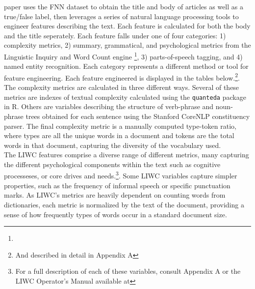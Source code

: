 \documentclass[12pt]{article}
\begin{document}
paper uses the FNN dataset to obtain the title and body of articles as
well as a true/false label, then leverages a series of natural language
processing tools to engineer features describing the text. Each feature
is calculated for both the body and the title seperately. Each feature
falls under one of four categories: 1) complexity metrics, 2) summary,
grammatical, and psychological metrics from the Linguistic Inquiry and
Word Count engine \footnote{}, 3) parts-of-speech tagging, and 4) named
entity recognition. Each category represents a different method or tool
for feature engineering. Each feature engineered is displayed in the
tables below.\footnote{And described in detail in Appendix A}.\\
\hspace*{0.333em}\hspace*{0.333em}\hspace*{0.333em}\hspace*{0.333em}\hspace*{0.333em}The
complexity metrics are calculated in three different ways. Several of
these metrics are indexes of textual complexity calculated using the
\texttt{quanteda} package in R. Others are variables describing the
structure of verb-phrase and noun-phrase trees obtained for each
sentence using the Stanford CoreNLP constituency parser. The final
complexity metric is a manually computed type-token ratio, where types
are all the unique words in a document and tokens are the total words in
that document, capturing the diversity of the vocabulary used.\\
\hspace*{0.333em}\hspace*{0.333em}\hspace*{0.333em}\hspace*{0.333em}\hspace*{0.333em}The
LIWC features comprise a diverse range of different metrics, many
capturing the different psychological components within the text such as
cognitive processeses, or core drives and needs.\footnote{For a full
  description of each of these variables, consult Appendix A or the LIWC
  Operator's Manual available at}. Some LIWC variables capture simpler
properties, such as the frequency of informal speech or specific
punctuation marks. As LIWC's metrics are heavily dependent on counting
words from dictionaries, each metric is normalized by the text of the
document, providing a sense of how frequently types of words occur in a
standard document size.\\
\end{document}
